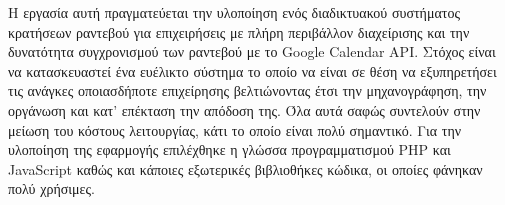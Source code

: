 
\Titlepage
\Declarationpage

\begin{Abstract}
Η εργασία αυτή πραγματεύεται την υλοποίηση ενός διαδικτυακού συστήματος κρατήσεων ραντεβού για επιχειρήσεις με πλήρη περιβάλλον διαχείρισης και την δυνατότητα συγχρονισμού των ραντεβού με το Google Calendar API. Στόχος είναι να κατασκευαστεί ένα ευέλικτο σύστημα το οποίο να είναι σε θέση να εξυπηρετήσει τις ανάγκες οποιασδήποτε επιχείρησης βελτιώνοντας έτσι την μηχανογράφηση, την οργάνωση και κατ' επέκταση την απόδοση της. Όλα αυτά σαφώς συντελούν στην μείωση του κόστους λειτουργίας, κάτι το οποίο είναι πολύ σημαντικό. Για την υλοποίηση της εφαρμογής επιλέχθηκε η γλώσσα προγραμματισμού PHP και JavaScript καθώς και κάποιες εξωτερικές βιβλιοθήκες κώδικα, οι οποίες φάνηκαν πολύ χρήσιμες.
\end{Abstract}

\tableofcontents
\listoffigures


